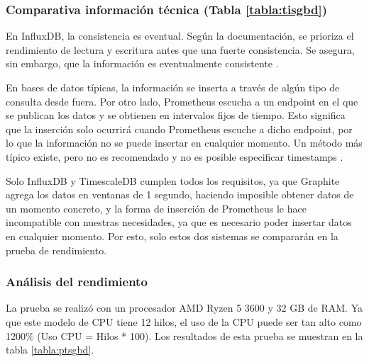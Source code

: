 \subsubsection{Comparativa información técnica (Tabla \ref{tabla:tisgbd})} En InfluxDB, la consistencia es eventual. Según
la documentación, se prioriza el rendimiento de lectura y escritura antes que una fuerte consistencia. Se asegura, sin 
embargo, que la información es eventualmente consistente \cite{influx:consistency}.

En bases de datos típicas, la información se inserta a través de algún tipo de consulta desde fuera. Por otro lado, 
Prometheus escucha a un endpoint en el que se publican los datos y se obtienen en intervalos fijos de tiempo. Esto 
significa que la inserción solo ocurrirá cuando Prometheus escuche a dicho endpoint, por lo que la información no se 
puede insertar en cualquier momento. Un método más típico existe, pero no es recomendado y no es posible especificar 
timestamps \cite{prom:pushgateway}.

Solo InfluxDB y TimescaleDB cumplen todos los requisitos, ya que Graphite agrega los datos en ventanas de 1 segundo,
haciendo imposible obtener datos de un momento concreto, y la forma de inserción de Prometheus le hace incompatible 
con nuestras necesidades, ya que es necesario poder insertar datos en cualquier momento. Por esto, solo estos dos
sistemas se compararán en la prueba de rendimiento.

\subsubsection{Análisis del rendimiento} La prueba se realizó con un procesador AMD Ryzen 5 3600 y 32 GB de RAM. Ya que 
este modelo de CPU tiene 12 hilos, el uso de la CPU puede ser tan alto como 1200\% (Uso CPU = Hilos * 100). Los resultados
de esta prueba se muestran en la tabla \ref{tabla:ptsgbd}.


